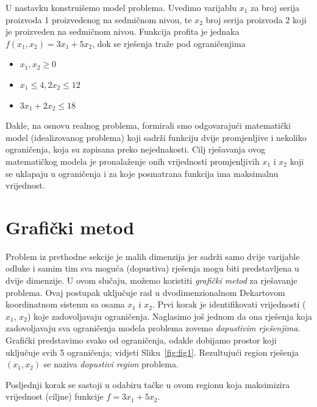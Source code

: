\documentclass[a4paper, utf8, 11pt, colorlinks]{book}
\begin{document}
U nastavku konstruišemo model problema. Uvedimo varijablu $x_1$ za broj serija proizvoda 1 proizvedenog na sedmičnom nivou, te $x_2$ broj serija proizvoda 2 koji je proizveden na sedmičnom nivou. Funkcija profita je jednaka $f(x_1, x_2) = 3 x_1 + 5 x_2$, dok se rješenja traže pod ograničenjima
\begin{itemize}
    \item $x_1, x_2 \geq 0$
    \item  $x_1 \leq 4, 2 x_2 \leq 12$
    \item $3 x_1 + 2 x_2 \leq 18$
\end{itemize}

Dakle, na osnovu realnog problema, formirali smo odgovarajući matematički model (idealizovanog problema) koji sadrži funkciju dvije promjenljive i nekoliko ograničenja, koja su zapisana preko nejednakosti. Cilj rješavanja ovog matematičkog modela je pronalaženje onih vrijednosti promjenljivih $x_1$ i $x_2$ koji se uklapaju u ograničenja i za koje posmatrana funkcija ima maksimalnu vrijednost.

\section{Grafički metod}
 Problem iz prethodne sekcije je malih dimenzija jer sadrži samo dvije varijable odluke i samim tim sva moguća (dopustiva) rješenja mogu biti predstavljena u dvije dimenzije. U ovom slučaju, možemo koristiti \emph{grafički metod} za rješavanje problema. Ovaj postupak uključuje rad u dvodimenzionalnom Dekartovom koordinatnom sistemu sa osama $x_1$ i $x_2$.  Prvi korak je identifikovati vrijednosti ($x_1$, $x_2$) koje zadovoljavaju ograničenja. Naglasimo još jednom da ona rješenja koja zadovoljavaju sva ograničenja modela  problema zovemo \emph{dopustivim rješenjima}. Grafički predstavimo svako od ograničenja, odakle dobijamo prostor koji uključuje svih 5 ograničenja; vidjeti Sliku~\ref{fig:fig1}.  Rezultujući region rješenja $(x_1, x_2)$ se naziva \emph{dopustivi region} problema.
 
 Posljednji korak se sastoji u odabiru tačke u ovom regionu  koja maksimizira vrijednost (ciljne) funkcije $f = 3x_1 + 5x_2$. 
\end{document}
